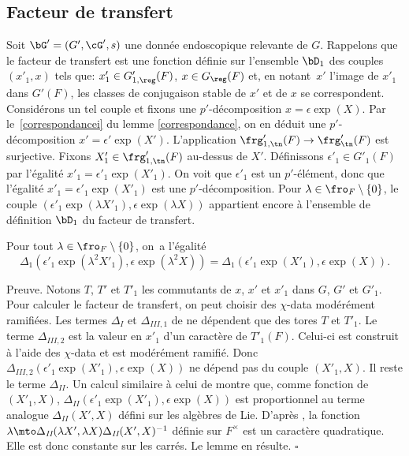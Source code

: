 \subsection{Facteur de transfert}\label{facteurdetransfert}
Soit $\bG'=(G',\cG',s)$ une donnée endoscopique relevante de $G$. Rappelons que le facteur de transfert est une fonction définie sur l'ensemble $\bD_{1}$ des couples $(x'_{1},x)$ tels que: $x'_{1}\in G'_{1,\reg}(F)$, $x\in G_{\reg}(F)$ et, en notant~$x'$ l'image de $x'_{1}$ dans $G'(F)$, les classes de conjugaison stable de $x'$ et de $x$ se correspondent. Considérons un tel couple et fixons une
$p'$-décomposition $x=\epsilon \exp(X)$. Par le~\eqref{correspondancei} du
lemme \ref{correspondance}, on en déduit une $p'$-décomposition $x'=\epsilon' \exp(X')$. L'application $\frg'_{1,\tn}(F)\to \frg'_{\tn}(F)$ est surjective. Fixons $X'_{1}\in \frg'_{1,\tn}(F)$ au-dessus de $X'$. Définissons $\epsilon'_{1}\in G'_{1}(F)$ par l'égalité $x'_{1}=\epsilon'_{1}\exp(X'_{1})$. On voit que $\epsilon'_{1}$ est un $p'$-élément, donc que l'égalité $x'_{1}=\epsilon'_{1}\exp(X'_{1})$ est une $p'$-décomposition. Pour $\lambda\in \fro_{F}\setminus\{0\}$, le couple $(\epsilon'_{1}\exp(\lambda X'_{1}),\epsilon \exp(\lambda X))$ appartient encore à l'ensemble de définition $\bD_{1}$ du facteur de transfert.

\begin{lem*}
Pour tout $\lambda\in \fro_{F}\setminus\{0\}$, on~a l'égalité
\[
\Delta_{1}(\epsilon'_{1}\exp(\lambda^2 X'_{1}),\epsilon \exp(\lambda^2 X))=\Delta_{1}(\epsilon'_{1}\exp( X'_{1}),\epsilon \exp( X)).
\]
\end{lem*}

Preuve. Notons $T$, $T'$ et $T'_{1}$ les commutants de $x$, $x'$ et $x'_{1}$ dans $G$, $G'$ et $G'_{1}$. Pour calculer le facteur de transfert, on peut choisir des $\chi$-data modérément ramifiées. Les termes $\Delta_{I}$ et $\Delta_{\textit{III},1}$ de \cite{LS} ne dépendent que des tores $T$ et $T'_{1}$. Le terme $\Delta_{\textit{III},2}$ est la valeur en $x'_{1}$ d'un caractère de $T'_{1}(F)$. Celui-ci est construit à l'aide des $\chi$\nobreakdash-data et est modérément ramifié. Donc $\Delta_{\textit{III},2}(\epsilon'_{1}\exp( X'_{1}),\epsilon \exp( X))$ ne dépend pas du couple $(X'_{1},X)$. Il reste le terme $\Delta_{\textit{II}}$. Un calcul similaire à celui de \cite[Lem.\, 10.3]{W4} montre que, comme fonction de $(X'_{1},X)$, $\Delta_{\textit{II}}(\epsilon'_{1}\exp( X'_{1}),\epsilon \exp( X))$ est proportionnel au terme analogue $\Delta_{\textit{II}}(X',X)$ défini sur les algèbres de Lie. D'après \cite[Lem.\,3.2.1]{F}, la fonction $\lambda\mto \Delta_{\textit{II}}(\lambda X',\lambda X)\Delta_{\textit{II}}(X',X)^{-1}$ définie sur $F^{\times}$ est un caractère quadratique. Elle est donc constante sur les carrés. Le lemme en résulte. $\square$

